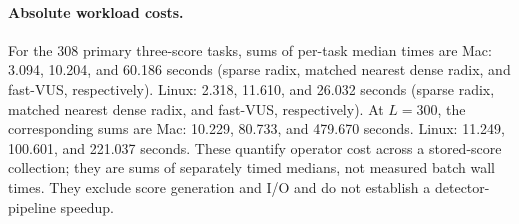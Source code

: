 \paragraph{Absolute workload costs.}
For the 308 primary three-score tasks, sums of per-task median times are
Mac: 3.094, 10.204, and 60.186 seconds (sparse radix, matched nearest dense radix, and fast-VUS, respectively).
Linux: 2.318, 11.610, and 26.032 seconds (sparse radix, matched nearest dense radix, and fast-VUS, respectively).
At $L=300$, the corresponding sums are Mac: 10.229, 80.733, and 479.670 seconds.
Linux: 11.249, 100.601, and 221.037 seconds.
These quantify operator cost across a stored-score collection; they are
sums of separately timed medians, not measured batch wall times. They exclude
score generation and I/O and do not establish a detector-pipeline speedup.
